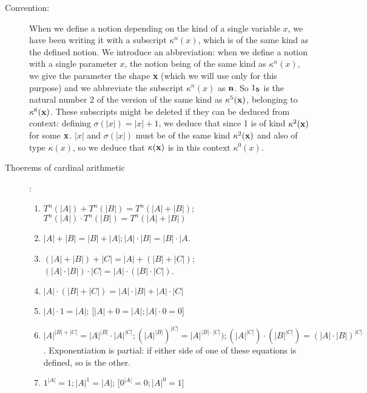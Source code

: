 \documentclass[12pt]{article}
\begin{document}
\begin{description}

\item[Convention:]  When we define a notion depending on the kind of a single variable $x$, we have been writing it with a subscript $\kappa^n(x)$, which is of the same kind as the defined notion.  We introduce an abbreviation:
when we define a notion with a single parameter $x$, the notion being of the same kind as $\kappa^n(x)$, we give the parameter the shape {\bf x} (which we will use only for this purpose) and we abbreviate the subscript ${\kappa^n(x)}$ as ${\bf n}$.   So $1_{\bf 5}$ is the natural number 2 of the version of the same kind as $\kappa^5({\bf x})$, belonging to $\kappa^6({\bf x})$.  These subscripts might be deleted if they can be deduced from context:
defining $\sigma(|x|)=|x|+1$, we deduce that since 1 is of kind $\kappa^2({\bf x})$ for some ${\bf x}$. $|x|$ and $\sigma(|x|)$ must be of the same kind $\kappa^2({\bf x})$ and also of type $\kappa(x)$, so we deduce that
$\kappa({\bf x})$ is in this context $\kappa^0(x)$.

\item[Thoerems of cardinal arithmetic]:\newline

\begin{enumerate}

\item $T^n(|A|)+T^n(|B|) = T^n(|A|+|B|)$;  $T^n(|A|)\cdot T^n(|B|) = T^n(|A|+|B|)$

\item $|A|+|B|= |B|+|A|; |A|\cdot |B| = |B|\cdot |A$.

\item $(|A|+|B|)+|C| = |A|+(|B|+|C|)$;  $(|A|\cdot|B|)\cdot |C| = |A|\cdot(|B|\cdot|C|)$.

\item $|A|\cdot(|B|+|C|) = |A|\cdot|B|+|A|\cdot|C|$

\item$|A|\cdot 1 = |A|$; [$|A|+0=|A|; |A|\cdot 0 = 0$]

\item$|A|^{|B|+|C|} = |A|^{|B|}\cdot |A|^{|C|};  (|A|^{|B|})^{|C|} = |A|^{|B|\cdot |C|});  (|A|^{|C|})\cdot(|B|^{|C|}) = (|A|\cdot {|B|})^{{|C|}}$.  Exponentiation is partial:  if either side of one of these equations is defined, so is the other.

\item $1^{|A|} = 1;  |A|^1=|A|$; [$0^{|A|}= 0; |A|^0=1$]


\end{enumerate}
\end{description}
\end{document}
